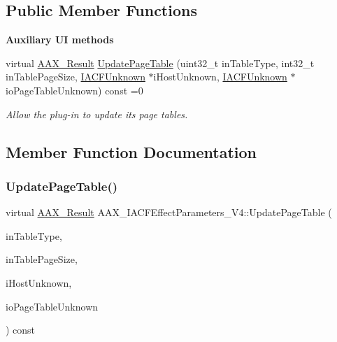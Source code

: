 \subsection*{Public Member Functions}
\begin{Indent}\textbf{ Auxiliary UI methods}\par
\begin{DoxyCompactItemize}
\item 
virtual \mbox{\hyperlink{a00392_a4d8f69a697df7f70c3a8e9b8ee130d2f}{A\+A\+X\+\_\+\+Result}} \mbox{\hyperlink{a01685_a4cdb043ffbdca6f6c4a7e9a96a4347a2}{Update\+Page\+Table}} (uint32\+\_\+t in\+Table\+Type, int32\+\_\+t in\+Table\+Page\+Size, \mbox{\hyperlink{a01409}{I\+A\+C\+F\+Unknown}} $\ast$i\+Host\+Unknown, \mbox{\hyperlink{a01409}{I\+A\+C\+F\+Unknown}} $\ast$io\+Page\+Table\+Unknown) const =0
\begin{DoxyCompactList}\small\item\em Allow the plug-\/in to update its page tables. \end{DoxyCompactList}\end{DoxyCompactItemize}
\end{Indent}


\subsection{Member Function Documentation}
\mbox{\label{a01685_a4cdb043ffbdca6f6c4a7e9a96a4347a2}} 
\subsubsection{\texorpdfstring{UpdatePageTable()}{UpdatePageTable()}}
{\footnotesize\ttfamily virtual \mbox{\hyperlink{a00392_a4d8f69a697df7f70c3a8e9b8ee130d2f}{A\+A\+X\+\_\+\+Result}} A\+A\+X\+\_\+\+I\+A\+C\+F\+Effect\+Parameters\+\_\+\+V4\+::\+Update\+Page\+Table (\begin{DoxyParamCaption}\item[{uint32\+\_\+t}]{in\+Table\+Type,  }\item[{int32\+\_\+t}]{in\+Table\+Page\+Size,  }\item[{\mbox{\hyperlink{a01409}{I\+A\+C\+F\+Unknown}} $\ast$}]{i\+Host\+Unknown,  }\item[{\mbox{\hyperlink{a01409}{I\+A\+C\+F\+Unknown}} $\ast$}]{io\+Page\+Table\+Unknown }\end{DoxyParamCaption}) const\hspace{0.3cm}{\ttfamily [pure virtual]}}



